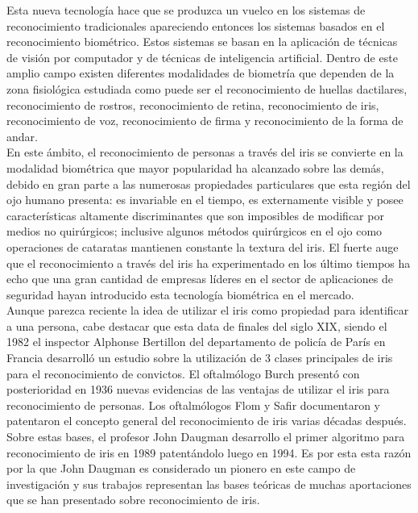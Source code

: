 Esta nueva tecnología hace que se produzca un vuelco en los sistemas de reconocimiento tradicionales apareciendo entonces los sistemas basados en el reconocimiento biométrico. Estos sistemas se basan en la aplicación de técnicas de visión por computador y de técnicas de inteligencia artificial. Dentro de este amplio campo existen diferentes modalidades de biometría que dependen de la zona fisiológica estudiada como puede ser el reconocimiento de huellas dactilares, reconocimiento de rostros, reconocimiento de retina, reconocimiento de iris, reconocimiento de voz, reconocimiento de firma y reconocimiento de la forma de andar.  \\

En este ámbito, el reconocimiento de personas a través del iris se convierte en la modalidad biométrica que mayor popularidad ha alcanzado sobre las demás, debido en gran parte a las numerosas propiedades particulares que esta región del ojo humano presenta: es invariable en el tiempo, es externamente visible y posee características altamente discriminantes que son imposibles de modificar por medios no quirúrgicos; inclusive algunos métodos quirúrgicos en el ojo como operaciones de cataratas mantienen constante la textura del iris. El fuerte auge que el reconocimiento a través del iris ha experimentado en los último tiempos ha echo que una gran cantidad de empresas líderes en el sector de aplicaciones de seguridad hayan introducido esta tecnología biométrica en el mercado.\\

Aunque parezca reciente la idea de utilizar el iris como propiedad para identificar a una persona, cabe destacar que esta data de finales del siglo XIX, siendo el 1982 el inspector Alphonse Bertillon del departamento de policía de París en Francia desarrolló un estudio sobre la utilización de 3 clases principales de iris para el reconocimiento de convictos. El oftalmólogo Burch presentó con posterioridad en 1936 nuevas evidencias de las ventajas de utilizar el iris para reconocimiento de personas. Los oftalmólogos Flom y Safir documentaron y patentaron el concepto general del reconocimiento de iris varias décadas después. Sobre estas bases, el profesor John Daugman desarrollo el primer algoritmo para reconocimiento de iris en 1989 patentándolo luego en 1994. Es por esta esta razón por la que John Daugman es considerado un pionero en este campo de investigación y sus trabajos representan las bases teóricas de muchas aportaciones que se han presentado sobre reconocimiento de iris. \\

